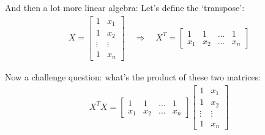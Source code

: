 \documentclass[aspectratio=169]{beamer}
\begin{document}
\begin{frame}{And then a lot more linear algebra:}
Let's define the `transpose':
\begin{align*}
X = \begin{bmatrix} 
  1 & x_1\\
  1 & x_2\\
  \vdots & \vdots \\
  1 & x_n 
\end{bmatrix} \quad \Rightarrow \quad X^T = \begin{bmatrix} 
  1 & 1&\ldots & 1\\
  x_1& x_2 &\ldots & x_n
\end{bmatrix} 
\end{align*}

\pause

Now a challenge question: what's the product of these two matrices:
\begin{align*}
X^TX = 
\begin{bmatrix} 
  1 & 1&\ldots & 1\\
  x_1& x_2 &\ldots & x_n
\end{bmatrix} 
\begin{bmatrix} 
  1 & x_1\\
  1 & x_2\\
  \vdots & \vdots \\
  1 & x_n 
\end{bmatrix}
\end{align*}

\end{frame}
\end{document}
